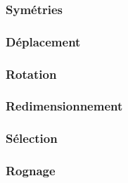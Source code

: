 \subsubsection{Symétries}
\subsubsection{Déplacement}
\subsubsection{Rotation}
\subsubsection{Redimensionnement}
\subsubsection{Sélection}
\subsubsection{Rognage}



